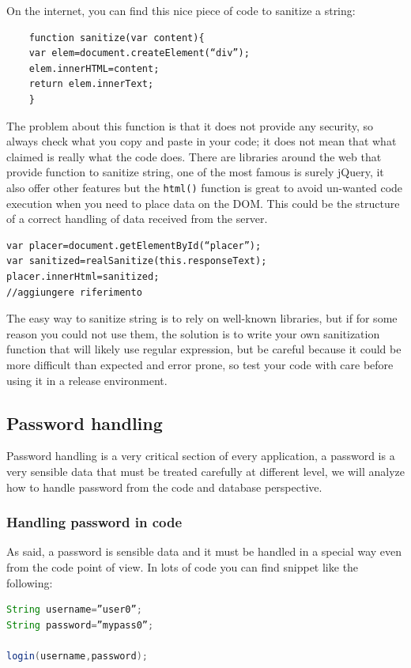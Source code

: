 On the internet, you can find this nice piece of code to sanitize a string:
\begin{lstlisting}
	function sanitize(var content){
	var elem=document.createElement(“div”);
	elem.innerHTML=content;
	return elem.innerText;
	}
\end{lstlisting}


The problem about this function is that it does not provide any security, so always check what you copy and paste in your code; it does not mean that what claimed is really what the code does.\newline
There are libraries around the web that provide function to sanitize string, one of the most famous is surely jQuery, it also offer other features but the \texttt{html()} function is great to avoid un-wanted code execution when you need to place data on the DOM.\newline
This could be the structure of a correct handling of data received from the server.\newline
\begin{lstlisting}
var placer=document.getElementById(“placer”);
var sanitized=realSanitize(this.responseText);
placer.innerHtml=sanitized;
//aggiungere riferimento
\end{lstlisting}
The easy way to sanitize string is to rely on well-known libraries, but if for some reason you could not use them, the solution is to write your own sanitization function that will likely use regular expression, but be careful because it could be more difficult than expected and error prone, so test your code with care before using it in a release environment.\newline

\subsection{Password handling}
Password handling is a very critical section of every application, a password is a very sensible data that must be treated carefully at different level, we will analyze how to handle password from the code and database perspective.\newline

\subsubsection{Handling password in code}
As said, a password is sensible data and it must be handled in a special way even from the code point of view.\newline
In lots of code you can find snippet like the following:
\begin{lstlisting}[language=java]
String username=”user0”;
String password=”mypass0”;

login(username,password);
\end{lstlisting}

